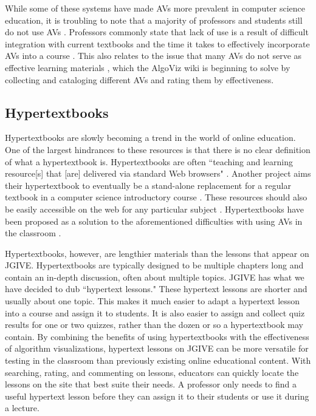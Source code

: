 \documentclass{acm_proc_article-sp}
\begin{document}
While some of these systems have made AVs more prevalent in computer science education, it is troubling to note that a majority of professors and students still do not use AVs \cite{taxonomy}. Professors commonly state that lack of use is a result of difficult integration with current textbooks \cite{ineducation} and the time it takes to effectively incorporate AVs into a course \cite{ineducation}.  This also relates to the issue that many AVs do not serve as effective learning materials \cite{avwiki}, which the AlgoViz wiki \cite{algoviz} is beginning to solve by collecting and cataloging different AVs and rating them by effectiveness.

\subsection{Hypertextbooks}
\label{Hypertextbooks}
Hypertextbooks are slowly becoming a trend in the world of online education. One of the largest hindrances to these resources is that there is no clear definition of what a hypertextbook is. Hypertextbooks are often ``teaching and learning resource[s] that [are] delivered via standard Web browsers" \cite{authoring}. Another project aims their hypertextbook to eventually be a stand-alone replacement for a regular textbook in a computer science introductory course \cite{promise}. These resources should also be easily accessible on the web for any particular subject \cite{fortheweb}. Hypertextbooks have been proposed as a solution to the aforementioned difficulties with using AVs in the classroom \cite{fortheweb,promise,vizcosh,prototype}.

Hypertextbooks, however, are lengthier materials than the lessons that appear on JGIVE. Hypertextbooks are typically designed to be multiple chapters long and contain an in-depth discussion, often about multiple topics. JGIVE has what we have decided to dub ``hypertext lessons." These hypertext lessons are shorter and usually about one topic. This makes it much easier to adapt a hypertext lesson into a course and assign it to students. It is also easier to assign and collect quiz results for one or two quizzes,  rather than the dozen or so a hypertextbook may contain. By combining the benefits of using hypertextbooks with the effectiveness of algorithm visualizations, hypertext lessons on JGIVE can be more versatile for testing in the classroom than previously existing online educational content. With searching, rating, and commenting on lessons, educators can quickly locate the lessons on the site that best suite their needs. A professor only needs to find a useful hypertext lesson before they can assign it to their students or use it during a lecture.
\end{document}
